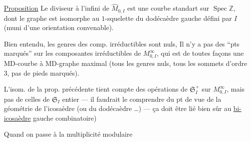 \uline{Proposition} Le diviseur à l'infini  de $\widehat M_{0,I}$ est une courbe standart  sur $\operatorname{Spec}\mathbb Z$, dont le graphe est isomorphe au  $1$-squelette du dodécaèdre gauche défini par $I$ (muni d'une orientation convenable).

Bien entendu, les genres des comp. irréductibles sont nuls, Il n'y a pas  des ``pts marqués'' sur  les  composantes irréductibles de $M^\infty_{0,I}$, qui est de toutes façons une MD-courbe  à MD-graphe maximal (tous les genres nuls, tous les sommets d'ordre $3$, pas de pieds marqués).

L'isom. de la prop. précédente tient compte des opérations de $\mathfrak S_I^+$  sur $M^\infty_{0,I}$, mais pas de celles de $\mathfrak S_I$  entier --- il faudrait le comprendre du pt de vue de la géométrie de l'icosaèdre  (ou du dodécaèdre \ldots) --- ça doit être lié bien sûr au \uline{bi-icosaèdre} gauche combinatoire)

Quand on passe à la multiplicité modulaire
